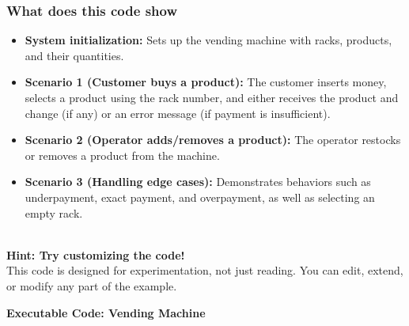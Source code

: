 \subsubsection{What does this code show}\label{l0n-xNKms8P4u_4lm29am}

\begin{itemize}
\item
\protect{}\label{Xjotngic98NVJyf3lRQMJ}
\textbf{System initialization:} Sets up the vending machine with racks, products, and their quantities.
\item
\protect{}\label{OTMypr7kMMUtC4sDeZ3No}
\textbf{Scenario 1 (Customer buys a product):} The customer inserts money, selects a product using the rack number, and either receives the product and change (if any) or an error message (if payment is insufficient).
\item
\protect{}\label{JbkvtawUh4jn9koZC-jR8}
\textbf{Scenario 2 (Operator adds/removes a product):} The operator restocks or removes a product from the machine.
\item
\protect{}\label{ZGyx8xzhVSmvX-WIyXId4}
\textbf{Scenario 3 (Handling edge cases):} Demonstrates behaviors such as underpayment, exact payment, and overpayment, as well as selecting an empty rack.
\end{itemize}
\\
\textbf{Hint: Try customizing the code!}
\\
This code is designed for experimentation, not just reading. You can edit, extend, or modify any part of the example.

\textbf{Executable Code: Vending Machine}

